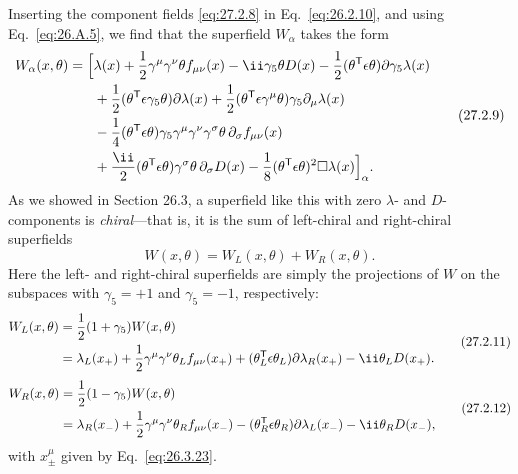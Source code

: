 Inserting the component fields \eqref{eq:27.2.8} in
Eq.~\eqref{eq:26.2.10}, and using Eq.~\eqref{eq:26.A.5}, we find that the
superfield \(W_\alpha\) takes the form
\begin{equation}
  \begin{aligned}
  W_\alpha(x,\theta)=\Bigl[&
    \lambda(x)
    +\frac12\gamma^\mu\gamma^\nu\theta f_{\mu\nu}(x)
    -\ii\gamma_5\theta D(x)
    -\frac12(\theta^{\mathsf T}\epsilon\theta)
      \sl{\partial}\gamma_5\lambda(x)
  \\
  &+\frac12(\theta^{\mathsf T}\epsilon\gamma_5\theta)
      \sl{\partial}\lambda(x)
    +\frac12(\theta^{\mathsf T}\epsilon\gamma^\mu\theta)
      \gamma_5\partial_\mu\lambda(x)
  \\
  &-\frac14(\theta^{\mathsf T}\epsilon\theta)
      \gamma_5\gamma^\mu\gamma^\nu\gamma^\sigma\theta\,
      \partial_\sigma f_{\mu\nu}(x)
  \\
  &+\frac{\ii}{2}(\theta^{\mathsf T}\epsilon\theta)
      \gamma^\sigma\theta\,\partial_\sigma D(x)
    -\frac18(\theta^{\mathsf T}\epsilon\theta)^2\Box\lambda(x)
  \Bigr]_\alpha.
  \end{aligned}
  \tag{27.2.9}\label{eq:27.2.9}
\end{equation}
As we showed in Section 26.3, a superfield like this with zero
\(\lambda\)- and \(D\)-components is \textit{chiral}---that is, it is the
sum of left-chiral and right-chiral superfields
\begin{equation}
  W(x,\theta)=W_L(x,\theta)+W_R(x,\theta).
  \tag{27.2.10}\label{eq:27.2.10}
\end{equation}
Here the left- and right-chiral superfields are simply the projections of
\(W\) on the subspaces with \(\gamma_5=+1\) and \(\gamma_5=-1\),
respectively:
\begin{equation}
  \begin{aligned}
  W_L(x,\theta)
  &=\frac12(1+\gamma_5)W(x,\theta)
  \\
  &=\lambda_L(x_+)
    +\frac12\gamma^\mu\gamma^\nu\theta_L f_{\mu\nu}(x_+)
    +(\theta_L^{\mathsf T}\epsilon\theta_L)
      \sl{\partial}\lambda_R(x_+)
    -\ii\theta_LD(x_+).
  \end{aligned}
  \tag{27.2.11}\label{eq:27.2.11}
\end{equation}
\begin{equation}
  \begin{aligned}
  W_R(x,\theta)
  &=\frac12(1-\gamma_5)W(x,\theta)
  \\
  &=\lambda_R(x_-)
    +\frac12\gamma^\mu\gamma^\nu\theta_R f_{\mu\nu}(x_-)
    -(\theta_R^{\mathsf T}\epsilon\theta_R)
      \sl{\partial}\lambda_L(x_-)
    -\ii\theta_RD(x_-),
  \end{aligned}
  \tag{27.2.12}\label{eq:27.2.12}
\end{equation}
with \(x_\pm^\mu\) given by Eq.~\eqref{eq:26.3.23}.

